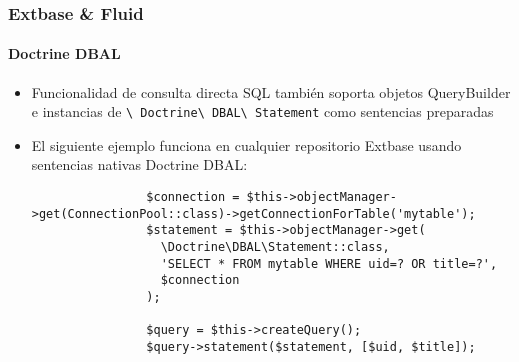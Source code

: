 \begin{frame}[fragile]
	\frametitle{Extbase \& Fluid}
	\framesubtitle{Doctrine DBAL}

	\lstset{basicstyle=\tiny\ttfamily}

	\begin{itemize}
		\item Funcionalidad de consulta directa SQL también soporta objetos QueryBuilder e instancias de
			\texttt{\textbackslash
			Doctrine\textbackslash
			DBAL\textbackslash
			Statement} como sentencias preparadas
		\item El siguiente ejemplo funciona en cualquier repositorio Extbase usando sentencias nativas Doctrine DBAL:

			\begin{lstlisting}
				$connection = $this->objectManager->get(ConnectionPool::class)->getConnectionForTable('mytable');
				$statement = $this->objectManager->get(
				  \Doctrine\DBAL\Statement::class,
				  'SELECT * FROM mytable WHERE uid=? OR title=?',
				  $connection
				);

				$query = $this->createQuery();
				$query->statement($statement, [$uid, $title]);
			\end{lstlisting}
	\end{itemize}

\end{frame}

